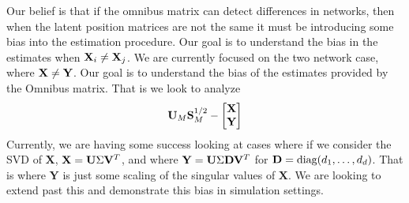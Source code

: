 \documentclass[12pt]{article}
\begin{document}
Our belief is that if the omnibus matrix can detect differences in networks, then when the latent position matrices are not the same it must be introducing some bias into the estimation procedure. Our goal is to understand the bias in the estimates when $\mathbf{X}_i\neq \mathbf{X}_j$. We are currently focused on the two network case, where $\mathbf{X}\neq \mathbf{Y}$. Our goal is to understand the bias of the estimates provided by the Omnibus matrix. That is we look to analyze 
\begin{equation}
    \mathbf{U}_M\mathbf{S}_M^{1/2} - \begin{bmatrix}
    \mathbf{X}\\\mathbf{Y}
    \end{bmatrix}
\end{equation}
Currently, we are having some success looking at cases where if we consider the SVD of $\mathbf{X}$, $\mathbf{X} = \mathbf{U}\Sigma\mathbf{V}^T$, and where $\mathbf{Y} = \mathbf{U}\Sigma\mathbf{D}\mathbf{V}^T$ for $\mathbf{D} = \text{diag}(d_1, \ldots, d_d)$. That is where $\mathbf{Y}$ is just some scaling of the singular values of $\mathbf{X}$. We are looking to extend past this and demonstrate this bias in simulation settings. 
\end{document}
